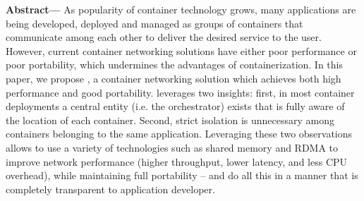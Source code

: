 \textbf{Abstract---} 
As popularity of container technology grows, many applications are being
developed, deployed and managed as groups of containers that communicate
among each other to deliver the desired service to the user.  However, current
container networking solutions have either poor performance or poor portability,
which undermines the advantages of containerization.  In this paper, we propose
\sysname, a container networking solution which achieves both high performance
and good portability. \sysname leverages two insights: first, in most container
deployments a central entity (i.e. the orchestrator) exists that is fully aware
of the location of each container. Second, strict isolation is unnecessary
among containers belonging to the same application. Leveraging these two
observations allows \sysname to use a variety of technologies such as shared
memory and RDMA to improve network performance (higher throughput, lower
latency, and less CPU overhead), while maintaining full portability -- and do
all this in a manner that is completely transparent to application developer.

